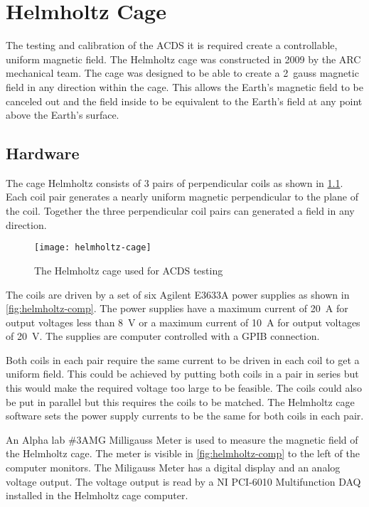

\chapter{Helmholtz Cage}

\label{ch:Helmholtz}

The testing and calibration of the \ac{ACDS} it is required create a controllable, uniform magnetic field. The Helmholtz cage was constructed in 2009 by the \ac{ARC} mechanical team. The cage was designed to be able to create a 2~gauss magnetic field in any direction within the cage. This allows the Earth's magnetic field to be canceled out and the field inside to be equivalent to the Earth's field at any point above the Earth's surface.

\section{Hardware}

The cage Helmholtz consists of 3 pairs of perpendicular coils as shown in \cref{fig:helmholtz}. Each coil pair generates a nearly uniform magnetic perpendicular to the plane of the coil. Together the three perpendicular coil pairs can generated a field in any direction.

\begin{figure}[!ht]
    \texttt{[image: helmholtz-cage]}
    \caption{The Helmholtz cage used for \acs{ACDS} testing}
    \label{fig:helmholtz}
\end{figure}

The coils are driven by a set of six Agilent E3633A power supplies as shown in \cref{fig:helmholtz-comp}. The power supplies have a maximum current of 20~A for output voltages less than 8~V or a maximum current of 10~A for output voltages of 20~V. The supplies are computer controlled with a \ac{GPIB} connection. 

Both coils in each pair require the same current to be driven in each coil to get a uniform field. This could be achieved by putting both coils in a pair in series but this would make the required voltage too large to be feasible. The coils could also be put in parallel but this requires the coils to be matched. The Helmholtz cage software sets the power supply currents to be the same for both coils in each pair.

An Alpha lab \#3AMG Milligauss Meter is used to measure the magnetic field of the Helmholtz cage. The meter is visible in \cref{fig:helmholtz-comp} to the left of the computer monitors. The Miligauss Meter has a digital display and an analog voltage output. The voltage output is read by a NI PCI-6010 Multifunction \ac{DAQ} installed in the Helmholtz cage computer.

